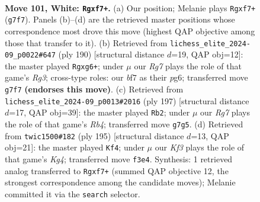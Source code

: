\documentclass[11pt]{article}
\begin{document}
\clearpage

\begin{figure}[p]\centering
\begin{subfigure}{0.46\textwidth}\centering
\resizebox{\linewidth}{!}{%
\newchessgame
\chessboard[
  setfen={7r/1k3bR1/5R2/8/8/5K2/8/8 w - - 4 101},
  showmover=false,
  pgfstyle=straightmove, color=movearrow, markmove={g7-f7}
]}
\caption{}
\end{subfigure}\hfill
\begin{subfigure}{0.46\textwidth}\centering
\resizebox{\linewidth}{!}{%
\newchessgame
\chessboard[
  setfen={8/6k1/2R3p1/r7/8/6RK/8/8 w - - 5 96},
  showmover=false,
  pgfstyle=straightmove, color=movearrow, markmove={g3-g6}
]}
\caption{}
\end{subfigure}
\\[4pt]
\begin{subfigure}{0.46\textwidth}\centering
\resizebox{\linewidth}{!}{%
\newchessgame
\chessboard[
  setfen={5R2/2k5/8/1rBK4/8/8/8/8 b - - 85 99},
  showmover=false,
  pgfstyle=straightmove, color=movearrow, markmove={b5-b2}
]}
\caption{}
\end{subfigure}\hfill
\begin{subfigure}{0.46\textwidth}\centering
\resizebox{\linewidth}{!}{%
\newchessgame
\chessboard[
  setfen={6R1/4K3/4B3/4r1k1/8/8/8/8 b - - 54 98},
  showmover=false,
  pgfstyle=straightmove, color=movearrow, markmove={g5-f4}
]}
\caption{}
\end{subfigure}
\caption{\textbf{Move 101, White: \texttt{Rgxf7+}.} (a) Our position; Melanie plays \texttt{Rgxf7+} (\texttt{g7f7}). Panels (b)--(d) are the retrieved master positions whose correspondence most drove this move (highest QAP objective among those that transfer to it). (b) Retrieved from \texttt{lichess\_elite\_2024-09\_p0022\#647} (ply 190) [structural distance $d$=19, QAP obj=12]: the master played \texttt{Rgxg6+}; under $\mu$ our \emph{Rg7} plays the role of that game's \emph{Rg3}; cross-type roles: our \emph{b}f7 as their \emph{p}g6; transferred move \texttt{g7f7} \textbf{(endorses this move)}. (c) Retrieved from \texttt{lichess\_elite\_2024-09\_p0013\#2016} (ply 197) [structural distance $d$=17, QAP obj=39]: the master played \texttt{Rb2}; under $\mu$ our \emph{Rg7} plays the role of that game's \emph{Rb4}; transferred move \texttt{g7g5}. (d) Retrieved from \texttt{twic1500\#182} (ply 195) [structural distance $d$=13, QAP obj=21]: the master played \texttt{Kf4}; under $\mu$ our \emph{Kf3} plays the role of that game's \emph{Kg4}; transferred move \texttt{f3e4}. Synthesis: 1 retrieved analog transferred to \texttt{Rgxf7+} (summed QAP objective 12, the strongest correspondence among the candidate moves); Melanie committed it via the \texttt{search} selector.}
\label{fig:thought-m200}
\end{figure}
\end{document}
